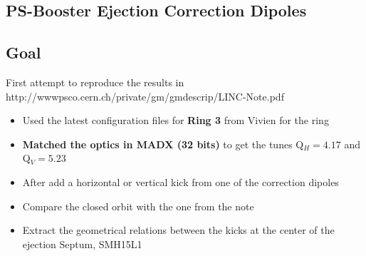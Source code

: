 \documentclass[11pt,letter,english]{article}
\begin{document}
\nocite{*} 

\small
\newcommand*{\data}{\ifcase\month\or
  January\or February\or March\or April\or May\or June\or
  July\or August\or September\or October\or November\or December\fi
  \space\number\day th,\space\number\year}
\newcommand{\blue}    {\color[named]{Blue}}
\newcommand{\black}   {\color[named]{Black}}
\newcommand{\red}     {\color[named]{Red}}
\newcommand{\green}   {\color[named]{Green}}
\newcommand{\orange}  {\color[named]{Orange}}
\newcommand{\yellow}  {\color[named]{Yellow}}
\newcommand{\magenta} {\color[named]{Magenta}}
\newcommand{\cyan}    {\color[named]{Cyan}}

\def\CP{{\sffamily CP}}

\begin{center}
 \section*{\huge{PS-Booster Ejection Correction Dipoles}} 
 \vspace {0.6cm}
\end{center}

\subsection*{Goal}

First attempt to reproduce the results in http://wwwpsco.cern.ch/private/gm/gmdescrip/LINC-Note.pdf

\begin{itemize}
\item{Used the latest configuration files for {\bf Ring 3} from Vivien for the ring}
\item{{\bf Matched the optics in MADX (32 bits)} to get the tunes Q$_H=4.17$ and Q$_V=5.23$}
\item{After add a horizontal or vertical kick from one of the correction dipoles}
\item{Compare the closed orbit with the one from the note}
\item{Extract the geometrical relations between the kicks at the center of the ejection Septum, SMH15L1}
\end{itemize}
\end{document}
